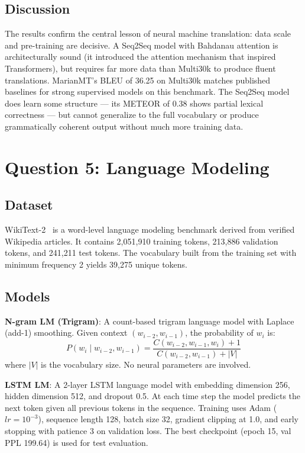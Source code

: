 \documentclass[12pt,a4paper]{article}
\begin{document}
\subsection{Discussion}

The results confirm the central lesson of neural machine translation: data scale and pre-training are decisive. A Seq2Seq model with Bahdanau attention is architecturally sound (it introduced the attention mechanism that inspired Transformers), but requires far more data than Multi30k to produce fluent translations. MarianMT's BLEU of 36.25 on Multi30k matches published baselines for strong supervised models on this benchmark. The Seq2Seq model does learn some structure — its METEOR of 0.38 shows partial lexical correctness — but cannot generalize to the full vocabulary or produce grammatically coherent output without much more training data.

\section{Question 5: Language Modeling}

\subsection{Dataset}

WikiText-2~\citep{merity2017wikitext} is a word-level language modeling benchmark derived from verified Wikipedia articles. It contains 2{,}051{,}910 training tokens, 213{,}886 validation tokens, and 241{,}211 test tokens. The vocabulary built from the training set with minimum frequency 2 yields 39{,}275 unique tokens.

\subsection{Models}

\textbf{N-gram LM (Trigram)}: A count-based trigram language model with Laplace (add-1) smoothing. Given context $(w_{i-2}, w_{i-1})$, the probability of $w_i$ is:
\[
P(w_i \mid w_{i-2}, w_{i-1}) = \frac{C(w_{i-2}, w_{i-1}, w_i) + 1}{C(w_{i-2}, w_{i-1}) + |V|}
\]
where $|V|$ is the vocabulary size. No neural parameters are involved.

\textbf{LSTM LM}: A 2-layer LSTM language model with embedding dimension 256, hidden dimension 512, and dropout 0.5. At each time step the model predicts the next token given all previous tokens in the sequence. Training uses Adam ($lr=10^{-3}$), sequence length 128, batch size 32, gradient clipping at 1.0, and early stopping with patience 3 on validation loss. The best checkpoint (epoch 15, val PPL 199.64) is used for test evaluation.
\end{document}
